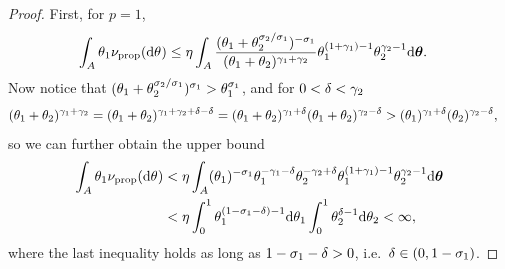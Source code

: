 \begin{proof}
    First, for $p=1$,
    \begin{align*}
    \int_A \variantfreqperpop{1}\ratemeasproposed(\de\vecvariantfreq{}) & \le \eta \int_A \frac{(\variantfreqperpop{1}+\variantfreqperpop{2}^{\rate{2}/\rate{1}})^{-\rate{1}}}{(\variantfreqperpop{1}+\variantfreqperpop{2})^{\corr{1}+\corr{2}}}\variantfreqperpop{1}^{(1+\corr{1})-1}\variantfreqperpop{2}^{\corr{2}-1}\de\btheta.
        \end{align*} 
    Now notice that $(\theta_{1}+\theta_{2}^{\sigma_{2}/\sigma_{1}})^{\sigma_{1}}>\theta_{1}^{\sigma_{1}}$, and for $0<\delta<\gamma_{2}$
    \begin{align*}
    	(\theta_{1}+\theta_{2})^{\gamma_{1}+\gamma_{2}} &= (\theta_{1}+\theta_{2})^{\gamma_{1}+\gamma_{2}+\delta-\delta} 
												=(\theta_{1}+\theta_{2})^{\gamma_{1}+\delta} (\theta_{1}+\theta_{2})^{\gamma_{2}-\delta}
												>(\theta_{1})^{\gamma_{1} + \delta } (\theta_{2})^{\gamma_{2} - \delta},
	\end{align*}
	so we can further obtain the upper bound
    \begin{align}
     \int_A \variantfreqperpop{1}\ratemeasproposed(\de\vecvariantfreq{}) & < \eta \int_A (\variantfreqperpop{1})^{-\rate{1}} \variantfreqperpop{1}^{-\corr{1}-\delta} \variantfreqperpop{2}^{-\corr{2}+\delta} \variantfreqperpop{1}^{(1+\corr{1})-1}\variantfreqperpop{2}^{\corr{2}-1}\de\btheta \nonumber \\
     &< \eta \int_0^1 \variantfreqperpop{1}^{(1-\rate{1}-\delta) -1} \de \variantfreqperpop{1} \int_0^1 \variantfreqperpop{2}^{\delta-1}\de\variantfreqperpop{2} < \infty, \label{eq:req_p1}
    \end{align}    
	where the last inequality holds as long as $1-\sigma_{1}-\delta > 0$, i.e.\ $\delta \in (0,1-\sigma_{1})$.


\end{proof}
